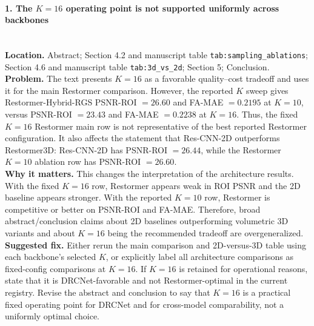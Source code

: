 \documentclass[11pt]{article}
\newcommand{\findingtitle}[1]{\paragraph{#1}\mbox{}\\}
\newcommand{\loc}[1]{\textbf{Location.} #1\\}
\newcommand{\problem}[1]{\textbf{Problem.} #1\\}
\newcommand{\why}[1]{\textbf{Why it matters.} #1\\}
\newcommand{\fix}[1]{\textbf{Suggested fix.} #1\par}
\begin{document}
\findingtitle{1. The $K=16$ operating point is not supported uniformly across backbones}
\loc{Abstract; Section 4.2 and manuscript table \texttt{tab:sampling\_ablations}; Section 4.6 and manuscript table \texttt{tab:3d\_vs\_2d}; Section 5; Conclusion.}
\problem{The text presents $K=16$ as a favorable quality--cost tradeoff and uses it for the main Restormer comparison. However, the reported $K$ sweep gives Restormer-Hybrid-RGS PSNR-ROI $=26.60$ and FA-MAE $=0.2195$ at $K=10$, versus PSNR-ROI $=23.43$ and FA-MAE $=0.2238$ at $K=16$. Thus, the fixed $K=16$ Restormer main row is not representative of the best reported Restormer configuration. It also affects the statement that Res-CNN-2D outperforms Restormer3D: Res-CNN-2D has PSNR-ROI $=26.44$, while the Restormer $K=10$ ablation row has PSNR-ROI $=26.60$.}
\why{This changes the interpretation of the architecture results. With the fixed $K=16$ row, Restormer appears weak in ROI PSNR and the 2D baseline appears stronger. With the reported $K=10$ row, Restormer is competitive or better on PSNR-ROI and FA-MAE. Therefore, broad abstract/conclusion claims about 2D baselines outperforming volumetric 3D variants and about $K=16$ being the recommended tradeoff are overgeneralized.}
\fix{Either rerun the main comparison and 2D-versus-3D table using each backbone's selected $K$, or explicitly label all architecture comparisons as fixed-config comparisons at $K=16$. If $K=16$ is retained for operational reasons, state that it is DRCNet-favorable and not Restormer-optimal in the current registry. Revise the abstract and conclusion to say that $K=16$ is a practical fixed operating point for DRCNet and for cross-model comparability, not a uniformly optimal choice.}
\end{document}
